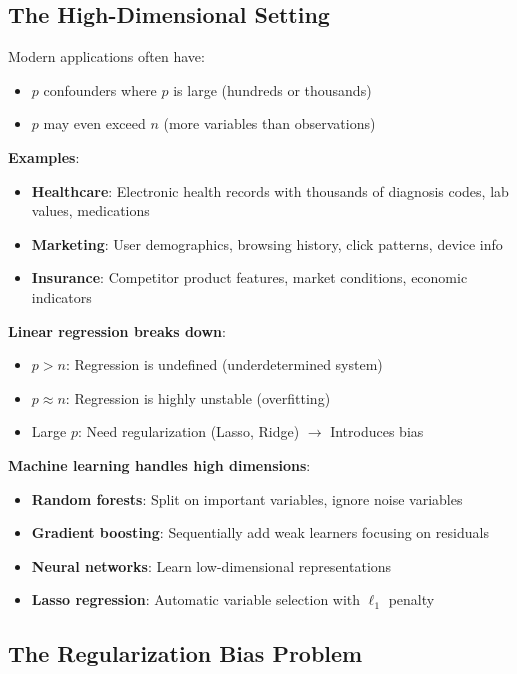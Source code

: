 \subsection{The High-Dimensional
Setting}\label{_the_high_dimensional_setting}

Modern applications often have:
\begin{itemize}
\item $p$ confounders where $p$ is large (hundreds or thousands)
\item $p$ may even exceed $n$ (more variables than observations)
\end{itemize}

\textbf{Examples}:
\begin{itemize}
\item \textbf{Healthcare}: Electronic health records with thousands of diagnosis codes, lab values, medications
\item \textbf{Marketing}: User demographics, browsing history, click patterns, device info
\item \textbf{Insurance}: Competitor product features, market conditions, economic indicators
\end{itemize}

\textbf{Linear regression breaks down}:
\begin{itemize}
\item $p > n$: Regression is undefined (underdetermined system)
\item $p \approx n$: Regression is highly unstable (overfitting)
\item Large $p$: Need regularization (Lasso, Ridge) $\to$ Introduces bias
\end{itemize}

\textbf{Machine learning handles high dimensions}:
\begin{itemize}
\item \textbf{Random forests}: Split on important variables, ignore noise variables
\item \textbf{Gradient boosting}: Sequentially add weak learners focusing on residuals
\item \textbf{Neural networks}: Learn low-dimensional representations
\item \textbf{Lasso regression}: Automatic variable selection with $\ell_1$ penalty
\end{itemize}

\subsection{The Regularization Bias
Problem}\label{subsec:ch01_regularization_bias}
%

